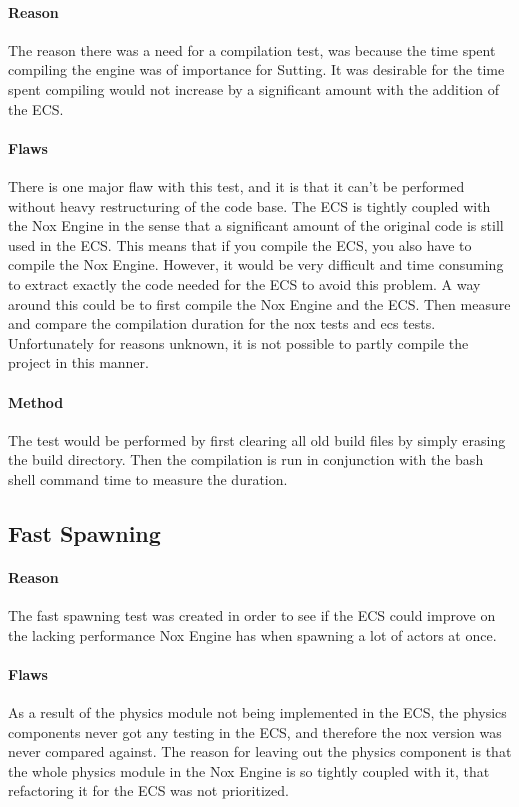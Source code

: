 \paragraph{Reason}
The reason there was a need for a compilation test, was because the time spent compiling the engine was of importance for Sutting.
It was desirable for the time spent compiling would not increase by a significant amount with the addition of the ECS.

\paragraph{Flaws}
There is one major flaw with this test, and it is that it can't be performed without heavy restructuring of the code base.
The ECS is tightly coupled with the Nox Engine in the sense that a significant amount of the original code is still used in the ECS.
This means that if you compile the ECS, you also have to compile the Nox Engine.
However, it would be very difficult and time consuming to extract exactly the code needed for the ECS to avoid this problem.
A way around this could be to first compile the Nox Engine and the ECS.
Then measure and compare the compilation duration for the nox tests and ecs tests.
Unfortunately for reasons unknown, it is not possible to partly compile the project in this manner.

\paragraph{Method}
The test would be performed by first clearing all old build files by simply erasing the build directory.
Then the compilation is run in conjunction with the bash shell command time to measure the duration.

\subsection{Fast Spawning}
\paragraph{Reason}
The fast spawning test was created in order to see if the ECS could improve on the lacking performance Nox Engine has when spawning a lot of actors at once.

\paragraph{Flaws}
As a result of the physics module not being implemented in the ECS, the physics components never got any testing in the ECS, and therefore the nox version was never compared against.
The reason for leaving out the physics component is that the whole physics module in the Nox Engine is so tightly coupled with it, that refactoring it for the ECS was not prioritized.

